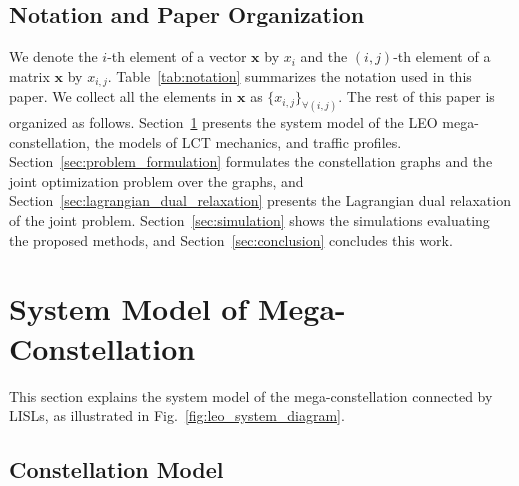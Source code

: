 \documentclass[journal]{IEEEtran}
\begin{document}
\subsection{Notation and Paper Organization}
We denote the $i$-th element of a vector $\mathbf{x}$ by $x_i$ and the $(i,j)$-th element of a matrix $\mathbf{x}$ by $x_{i,j}$.
Table~\ref{tab:notation} summarizes the notation used in this paper.
We collect all the elements in $\mathbf{x}$ as $\{x_{i,j}\}_{\forall(i,j)}$.
The rest of this paper is organized as follows. Section~\ref{sec:system_model} presents the system model of the LEO mega-constellation, the models of LCT mechanics, and traffic profiles.
Section~\ref{sec:problem_formulation} formulates the constellation graphs and the joint optimization problem over the graphs, and Section~\ref{sec:lagrangian_dual_relaxation} presents the Lagrangian dual relaxation of the joint problem.
Section~\ref{sec:simulation} shows the simulations evaluating the proposed methods, and Section~\ref{sec:conclusion} concludes this work.




\section{System Model of Mega-Constellation}\label{sec:system_model}
This section explains the system model of the mega-constellation connected by LISLs, as illustrated in Fig.~\ref{fig:leo_system_diagram}.

\subsection{Constellation Model}
\end{document}
